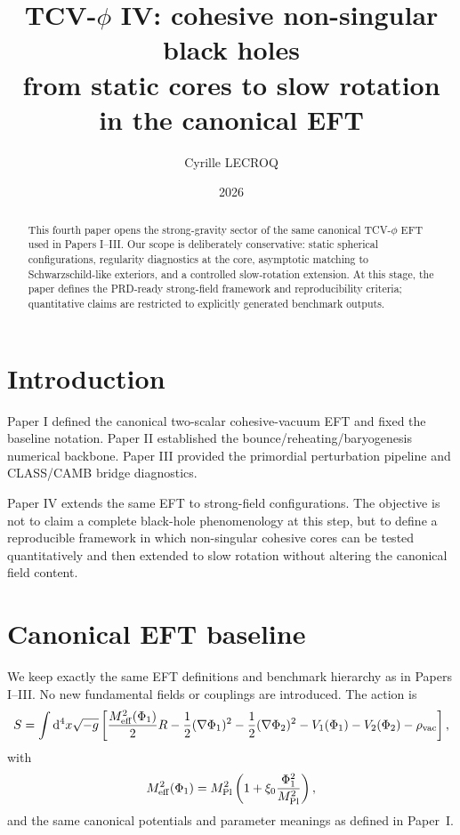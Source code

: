 \documentclass[aps,prd,onecolumn,nofootinbib,superscriptaddress]{revtex4-2}
\newcommand{\Mpl}{M_{\rm Pl}}
\newcommand{\Meff}{M_{\rm eff}}
\newcommand{\dd}{\mathrm{d}}
\begin{document}
\title{TCV-$\phi$ IV: cohesive non-singular black holes \\
from static cores to slow rotation in the canonical EFT}

\author{Cyrille LECROQ}

\date{2026}

\begin{abstract}
This fourth paper opens the strong-gravity sector of the same canonical TCV-$\phi$ EFT used in Papers I--III.
Our scope is deliberately conservative: static spherical configurations, regularity diagnostics at the core, asymptotic matching to Schwarzschild-like exteriors, and a controlled slow-rotation extension.
At this stage, the paper defines the PRD-ready strong-field framework and reproducibility criteria; quantitative claims are restricted to explicitly generated benchmark outputs.
\end{abstract}

\maketitle

\section{Introduction}
Paper I defined the canonical two-scalar cohesive-vacuum EFT and fixed the baseline notation.
Paper II established the bounce/reheating/baryogenesis numerical backbone.
Paper III provided the primordial perturbation pipeline and CLASS/CAMB bridge diagnostics.

Paper IV extends the same EFT to strong-field configurations.
The objective is not to claim a complete black-hole phenomenology at this step, but to define a reproducible framework in which non-singular cohesive cores can be tested quantitatively and then extended to slow rotation without altering the canonical field content.

\section{Canonical EFT baseline}
We keep exactly the same EFT definitions and benchmark hierarchy as in Papers I--III.
No new fundamental fields or couplings are introduced.
The action is
\begin{equation}
S=\int \dd^4x\sqrt{-g}\left[
\frac{\Meff^2(\Phi_1)}{2}R
-\frac{1}{2}(\nabla\Phi_1)^2
-\frac{1}{2}(\nabla\Phi_2)^2
-V_1(\Phi_1)-V_2(\Phi_2)-\rho_{\rm vac}
\right],
\end{equation}
with
\begin{equation}
\Meff^2(\Phi_1)=\Mpl^2\left(1+\xi_0\frac{\Phi_1^2}{\Mpl^2}\right),
\end{equation}
and the same canonical potentials and parameter meanings as defined in Paper~I.
\end{document}
